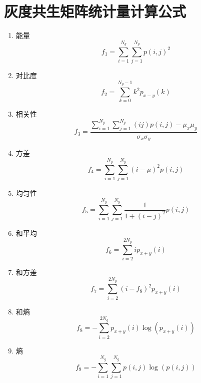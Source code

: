 \appendices

\section{灰度共生矩阵统计量计算公式}

\begin{enumerate}
	\item 能量
\begin{equation}
f_1=\sum_{i=1}^{N_g} \sum_{j=1}^{N_g} p(i, j)^2
\end{equation}

	\item 对比度
\begin{equation}
f_2=\sum_{k=0}^{N_g-1} k^2 p_{x-y}(k)
\end{equation}

	\item 相关性
\begin{equation}
f_3=\frac{\sum_{i=1}^{N_g} \sum_{j=1}^{N_g}(i j) p(i, j)-\mu_x \mu_y}{\sigma_x \sigma_y}
\end{equation}

	\item 方差
\begin{equation}
f_4=\sum_{i=1}^{N_g} \sum_{j=1}^{N_g}(i-\mu)^2 p(i, j)
\end{equation}

	\item 均匀性
\begin{equation}
f_5=\sum_{i=1}^{N_g} \sum_{j=1}^{N_g} \frac{1}{1+(i-j)^2} p(i, j)
\end{equation}


	\item 和平均
\begin{equation}
f_6=\sum_{i=2}^{2 N_g} i p_{x+y}(i)
\end{equation}

	\item 和方差
\begin{equation}
f_7=\sum_{i=2}^{2 N_g}\left(i-f_8\right)^2 p_{x+y}(i)
\end{equation}

	\item 和熵
\begin{equation}
f_8=-\sum_{i=2}^{2 N_g} p_{x+y}(i) \log \left(p_{x+y}(i)\right)
\end{equation}

	\item 熵
\begin{equation}
f_9=-\sum_{i=1}^{N_g} \sum_{j=1}^{N_g} p(i, j) \log (p(i, j))
\end{equation}


\end{enumerate}

